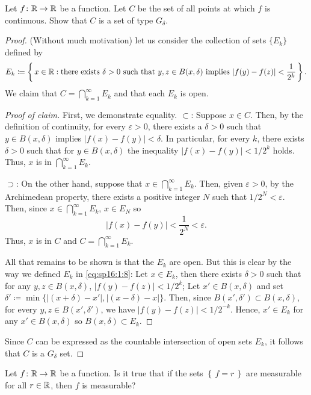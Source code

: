 \begin{problem}
Let $f\colon\mathbb{R}\to\mathbb{R}$ be a function. Let $C$ be the set of all points
at which $f$ is continuous. Show that $C$ is a set of type $G_\delta$.
\end{problem}
\begin{proof}
(Without much motivation) let us consider the collection of sets $\{E_k\}$
defined by
\begin{equation}
\label{eq:sp16:1:8}
E_k\coloneqq\left\{\,x\in\mathbb{R}:
\text{there exists $\delta>0$ such that $y,z\in B(x,\delta)$ implies $\left|f(y)-f(z)\right|<\frac{1}{2^k}$}\,\right\}.
\end{equation}
We claim that $C=\bigcap_{k=1}^\infty E_k$ and that each $E_k$ is open.
\begin{proof}[Proof of claim]
\renewcommand{\qedsymbol}{$\clubsuit$}
First, we demonstrate equality. $\subset$: Suppose $x\in C$. Then, by the
definition of continuity, for every $\varepsilon>0$, there exists a
$\delta>0$ such that $y\in B(x,\delta)$ implies $|f(x)-f(y)|<\delta$. In
particular, for every $k$, there exists $\delta>0$ such that for $y\in
B(x,\delta)$ the inequality $|f(x)-f(y)|<1/2^k$ holds. Thus, $x$ is in
$\bigcap_{k=1}^\infty E_k$.

$\supset$: On the other hand, suppose that $x\in\bigcap_{k=1}^\infty
E_k$. Then, given $\varepsilon>0$, by the Archimedean property, there
exists a positive integer $N$ such that $1/2^N<\varepsilon$. Then, since
$x\in\bigcap_{k=1}^\infty E_k$, $x\in E_N$ so
\begin{equation}
  \label{eq:sp16:1:9}
|f(x)-f(y)|<\frac{1}{2^N}<\varepsilon.
\end{equation}
Thus, $x$ is in $C$ and $C=\bigcap_{k=1}^\infty E_k$.

All that remains to be shown is that the $E_k$ are open. But this is clear
by the way we defined $E_k$ in \eqref{eq:sp16:1:8}: Let $x\in E_k$, then
there exists $\delta>0$ such that for any $y,z\in B(x,\delta)$,
$|f(y)-f(z)|<1/2^k$; Let $x'\in B(x,\delta)$ and set
$\delta'\coloneqq\min\{|(x+\delta)-x'|,|(x-\delta)-x|\}$. Then, since
$B(x',\delta')\subset B(x,\delta)$, for every $y,z\in B(x',\delta')$, we
have $|f(y)-f(z)|<1/2^{-k}$. Hence, $x'\in E_k$ for any $x'\in B(x,\delta)$
so $B(x,\delta)\subset E_k$.
\end{proof}
Since $C$ can be expressed as the countable intersection of open sets
$E_k$, it follows that $C$ is a $G_\delta$ set.
\end{proof}
\begin{problem}
Let $f\colon\mathbb{R}\to\mathbb{R}$ be a function. Is it true that if the sets
$\left\{\,f=r\,\right\}$ are measurable for all $r\in\mathbb{R}$, then $f$ is
measurable?
\end{problem}
